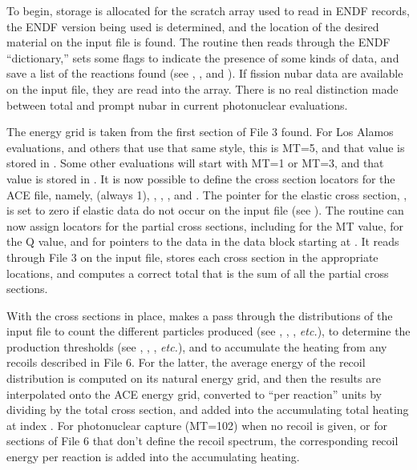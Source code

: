 To begin, storage is allocated for the scratch array used to read in
ENDF records, the ENDF version being used is determined, and the
location of the desired material on the input file is found.  The
routine then reads through the ENDF ``dictionary,'' sets some flags
to indicate the presence of some kinds of data, and save a list of
the reactions found (see , , and ).
If fission nubar data are available on the input file, they are read
into the  array.  There is no real distinction made
between total and prompt nubar in current photonuclear evaluations.

The energy grid is taken from the first section of File 3 found.
For Los Alamos evaluations, and others that use that same style,
this is MT=5, and that value is stored in .  Some other
evaluations will start with MT=1 or MT=3, and that value is stored
in .  It is now possible to define the cross section
locators for the ACE file, namely,  (always 1),
, , , and .  The
pointer for the elastic cross section, , is set to zero
if elastic data do not occur on the input file (see ).
The routine can now assign locators for the partial cross sections,
including  for the MT value,  for the Q value,
and  for pointers to the data in the data block starting
at .  It reads through File 3 on the input file, stores
each cross section in the appropriate locations, and computes a
correct total that is the sum of all the partial cross sections.

With the cross sections in place,  makes a pass through
the distributions of the input file to count the different particles
produced (see , , , {\it etc.}),
to determine the production thresholds (see ,
, , {\it etc.}), and to accumulate
the heating from any recoils described in File 6.  For the latter,
the average energy of the recoil distribution is computed on its
natural energy grid, and then the results are interpolated onto the
ACE energy grid, converted to ``per reaction'' units by dividing by
the total cross section, and added into the accumulating total
heating at index .   For photonuclear capture (MT=102)
when no recoil is given, or for sections of File 6 that don't define
the recoil spectrum, the corresponding recoil energy per reaction
is added into the accumulating heating.

